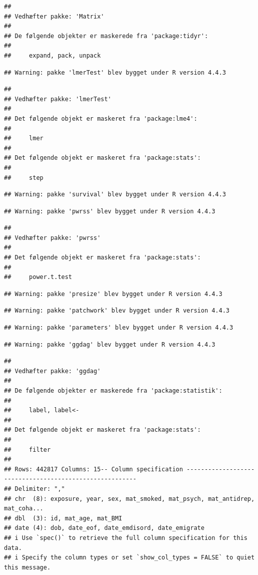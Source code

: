 \documentclass[
]{article}
\begin{document}
\begin{verbatim}
## 
## Vedhæfter pakke: 'Matrix'
## 
## De følgende objekter er maskerede fra 'package:tidyr':
## 
##     expand, pack, unpack
\end{verbatim}

\begin{verbatim}
## Warning: pakke 'lmerTest' blev bygget under R version 4.4.3
\end{verbatim}

\begin{verbatim}
## 
## Vedhæfter pakke: 'lmerTest'
## 
## Det følgende objekt er maskeret fra 'package:lme4':
## 
##     lmer
## 
## Det følgende objekt er maskeret fra 'package:stats':
## 
##     step
\end{verbatim}

\begin{verbatim}
## Warning: pakke 'survival' blev bygget under R version 4.4.3
\end{verbatim}

\begin{verbatim}
## Warning: pakke 'pwrss' blev bygget under R version 4.4.3
\end{verbatim}

\begin{verbatim}
## 
## Vedhæfter pakke: 'pwrss'
## 
## Det følgende objekt er maskeret fra 'package:stats':
## 
##     power.t.test
\end{verbatim}

\begin{verbatim}
## Warning: pakke 'presize' blev bygget under R version 4.4.3
\end{verbatim}

\begin{verbatim}
## Warning: pakke 'patchwork' blev bygget under R version 4.4.3
\end{verbatim}

\begin{verbatim}
## Warning: pakke 'parameters' blev bygget under R version 4.4.3
\end{verbatim}

\begin{verbatim}
## Warning: pakke 'ggdag' blev bygget under R version 4.4.3
\end{verbatim}

\begin{verbatim}
## 
## Vedhæfter pakke: 'ggdag'
## 
## De følgende objekter er maskerede fra 'package:statistik':
## 
##     label, label<-
## 
## Det følgende objekt er maskeret fra 'package:stats':
## 
##     filter
## 
## Rows: 442817 Columns: 15-- Column specification --------------------------------------------------------
## Delimiter: ","
## chr  (8): exposure, year, sex, mat_smoked, mat_psych, mat_antidrep, mat_coha...
## dbl  (3): id, mat_age, mat_BMI
## date (4): dob, date_eof, date_emdisord, date_emigrate
## i Use `spec()` to retrieve the full column specification for this data.
## i Specify the column types or set `show_col_types = FALSE` to quiet this message.
\end{verbatim}
\end{document}
